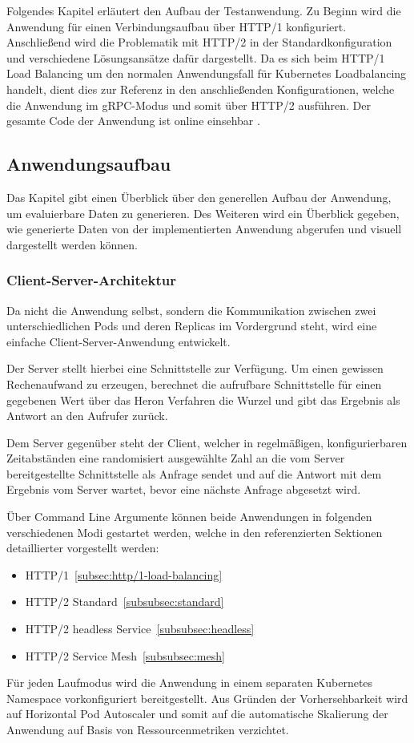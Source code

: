 Folgendes Kapitel erläutert den Aufbau der Testanwendung.
Zu Beginn wird die Anwendung für einen Verbindungsaufbau über HTTP/1 konfiguriert.
Anschließend wird die Problematik mit HTTP/2 in der Standardkonfiguration und verschiedene Lösungsansätze dafür dargestellt.
Da es sich beim HTTP/1 Load Balancing um den normalen Anwendungsfall für Kubernetes Loadbalancing handelt, dient dies zur Referenz in den anschließenden Konfigurationen, welche die Anwendung im gRPC-Modus und somit über HTTP/2 ausführen.
Der gesamte Code der Anwendung ist online einsehbar \cite{github}.

\subsection{Anwendungsaufbau}\label{subsec:anwendungsaufbau}
Das Kapitel gibt einen Überblick über den generellen Aufbau der Anwendung, um evaluierbare Daten zu generieren.
Des Weiteren wird ein Überblick gegeben, wie generierte Daten von der implementierten Anwendung abgerufen und visuell dargestellt werden können.

\subsubsection{Client-Server-Architektur}
Da nicht die Anwendung selbst, sondern die Kommunikation zwischen zwei unterschiedlichen Pods und deren Replicas im Vordergrund steht, wird eine einfache Client-Server-Anwendung entwickelt.

Der Server stellt hierbei eine Schnittstelle zur Verfügung.
Um einen gewissen Rechenaufwand zu erzeugen, berechnet die aufrufbare Schnittstelle für einen gegebenen Wert über das Heron Verfahren die Wurzel und gibt das Ergebnis als Antwort an den Aufrufer zurück.

Dem Server gegenüber steht der Client, welcher in regelmäßigen, konfigurierbaren Zeit\-ab\-stän\-den eine randomisiert ausgewählte Zahl an die vom Server bereitgestellte Schnittstelle als Anfrage sendet und auf die Antwort mit dem Ergebnis vom Server wartet, bevor eine nächste Anfrage abgesetzt wird.

Über Command Line Argumente können beide Anwendungen in folgenden verschiedenen Modi gestartet werden, welche in den referenzierten Sektionen detaillierter vorgestellt werden:
\begin{itemize}
    \item HTTP/1~\ref{subsec:http/1-load-balancing}
    \item HTTP/2 Standard~\ref{subsubsec:standard}
    \item HTTP/2 headless Service~\ref{subsubsec:headless}
    \item HTTP/2 Service Mesh~\ref{subsubsec:mesh}
\end{itemize}
Für jeden Laufmodus wird die Anwendung in einem separaten Kubernetes Namespace vorkonfiguriert bereitgestellt.
Aus Gründen der Vorhersehbarkeit wird auf Horizontal Pod Autoscaler und somit auf die automatische Skalierung der Anwendung auf Basis von Ressourcenmetriken verzichtet.

